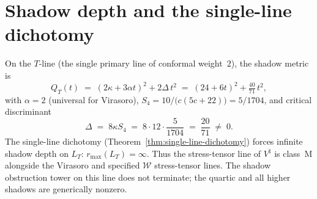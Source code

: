 \section{Shadow depth and the single-line dichotomy}

On the $T$-line (the single primary line of conformal weight~$2$),
the shadow metric is
\begin{equation}\label{eq:moonshine-shadow-metric}
Q_T(t)
\;=\;
(2\kappa + 3\alpha t)^2 + 2\Delta\,t^2
\;=\;
(24 + 6t)^2 + \tfrac{40}{71}\,t^2,
\end{equation}
with $\alpha = 2$ (universal for Virasoro),
$S_4 = 10/\bigl(c(5c{+}22)\bigr) = 5/1704$, and
critical discriminant
\begin{equation}\label{eq:moonshine-discriminant}
\Delta
\;=\;
8\kappa S_4
\;=\;
8 \cdot 12 \cdot \frac{5}{1704}
\;=\;
\frac{20}{71}
\;\neq\; 0.
\end{equation}
The single-line dichotomy
(Theorem~\ref{thm:single-line-dichotomy}) forces infinite
shadow depth on $L_T$: $r_{\max}(L_T) = \infty$. Thus the
stress-tensor line of $V^\natural$ is class~M alongside the
Virasoro and specified $\mathcal{W}$ stress-tensor lines. The
shadow obstruction tower on this line does not terminate; the
quartic and all higher shadows are generically nonzero.


